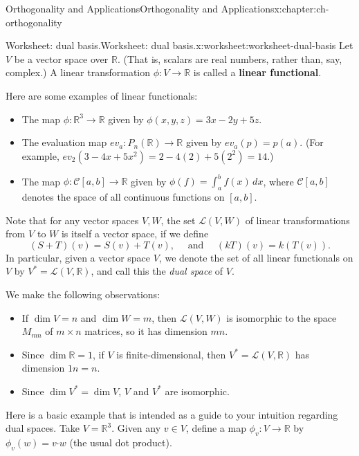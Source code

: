 \documentclass[oneside,10pt,]{book}
\newcommand{\terminology}[1]{\textbf{#1}}
\numberwithin{equation}{section}
\newcommand{\R}{\mathbb{R}}
\newcommand{\dotp}{\!\boldsymbol{\cdot}\!}
\begin{document}
\begin{chapterptx}{Orthogonality and Applications}{}{Orthogonality and Applications}{}{}{x:chapter:ch-orthogonality}
\begin{worksheet-section}{Worksheet: dual basis.}{}{Worksheet: dual basis.}{}{}{x:worksheet:worksheet-dual-basis}
Let \(V\) be a vector space over \(\R\). (That is, scalars are real numbers, rather than, say, complex.) A linear transformation \(\phi:V\to \R\) is called a \terminology{linear functional}.%
\par
Here are some examples of linear functionals:%
\begin{itemize}[label=\textbullet]
\item{}The map \(\phi:\R^3\to \R\) given by \(\phi(x,y,z) = 3x-2y+5z\).%
\item{}The evaluation map \(ev_a:P_n(\R)\to \R\) given by \(ev_a(p) = p(a)\). (For example, \(ev_2(3-4x+5x^2) = 2-4(2)+5(2^2) = 14\).)%
\item{}The map \(\phi:\mathcal{C}[a,b]\to \R\) given by \(\phi(f) = \int_a^b f(x)\,dx\), where \(\mathcal{C}[a,b]\) denotes the space of all continuous functions on \([a,b]\).%
\end{itemize}
%
\par
Note that for any vector spaces \(V,W\), the set \(\mathcal{L}(V,W)\) of linear transformations from \(V\) to \(W\) is itself a vector space, if we define%
\begin{equation*}
(S+T)(v) = S(v)+T(v),\quad \text{ and } \quad (kT)(v)=k(T(v))\text{.}
\end{equation*}
In particular, given a vector space \(V\), we denote the set of all linear functionals on \(V\) by \(V^*=\mathcal{L}(V,\R)\), and call this the \emph{dual space} of \(V\).%
\par
We make the following observations:%
\begin{itemize}[label=\textbullet]
\item{}If \(\dim V=n\) and \(\dim W=m\), then \(\mathcal{L}(V,W)\) is isomorphic to the space \(M_{mn}\) of \(m\times n\) matrices, so it has dimension \(mn\).%
\item{}Since \(\dim \R=1\), if \(V\) is finite-dimensional, then \(V^*=\mathcal{L}(V,\R)\) has dimension \(1n=n\).%
\item{}Since \(\dim V^*=\dim V\), \(V\) and \(V^*\) are isomorphic.%
\end{itemize}
%
\par
Here is a basic example that is intended as a guide to your intuition regarding dual spaces. Take \(V = \R^3\). Given any \(v\in V\), define a map \(\phi_{v}:V\to \R\) by \(\phi_{v}(w) = v\dotp w\) (the usual dot product).%
\par

\end{worksheet-section}
\end{chapterptx}
\end{document}
